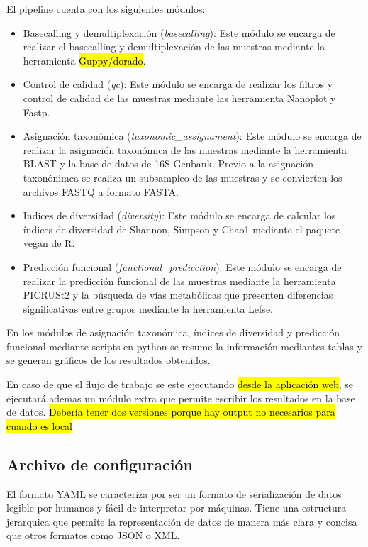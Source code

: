 El pipeline cuenta con los siguientes módulos: 
\begin{itemize}
    \item Basecalling y demultiplexación (\textit{basecalling}): Este módulo se encarga de realizar el basecalling y demultiplexación de las muestras mediante la herramienta \hl{Guppy/dorado}.
    \item Control de calidad (\textit{qc}): Este módulo se encarga de realizar los filtros y control de calidad de las muestras mediante las herramienta Nanoplot y Fastp.
    \item Asignación taxonómica (\textit{taxonomic\_assignament}): Este módulo se encarga de realizar la asignación taxonómica de las muestras mediante la herramienta BLAST y la base de datos de 16S Genbank. Previo a la asignación taxonónimca se realiza un subsampleo de las muestras y se convierten los archivos FASTQ a formato FASTA.
    \item Indices de diversidad (\textit{diversity}): Este módulo se encarga de calcular los índices de diversidad de Shannon, Simpson y Chao1 mediante el paquete vegan de R.
    \item Predicción funcional (\textit{functional\_predicction}): Este módulo se encarga de realizar la predicción funcional de las muestras mediante la herramienta PICRUSt2 y la búsqueda de vías metabólicas que presenten diferencias significativas entre grupos mediante la herramienta Lefse.
\end{itemize}

En los módulos de asignación taxonómica, índices de diversidad y predicción funcional mediante scripts en python se resume la información mediantes tablas y se generan gráficos de los resultados obtenidos.

En caso de que el flujo de trabajo se este ejecutando \hl{desde la aplicación web}, se ejecutará ademas un módulo extra que permite escribir los resultados en la base de datos.
\hl{Debería tener dos versiones porque hay output no necesarios para cuando es local}

\subsection{Archivo de configuración}
El formato YAML se caracteriza por ser un formato de serialización de datos legible por humanos y fácil de interpretar por máquinas.
Tiene una estructura jerarquica que permite la representación de datos de manera más clara y concisa que otros formatos como JSON o XML.

